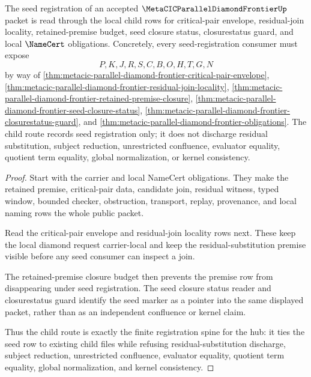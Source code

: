 \begin{theorem}
\label{thm:metacic-parallel-diamond-frontier-seed-registration-child-route}
The seed registration of an accepted $\MetaCICParallelDiamondFrontierUp$ packet is read through the local child rows for critical-pair envelope, residual-join locality, retained-premise budget, seed closure status, closurestatus guard, and local $\NameCert$ obligations. Concretely, every seed-registration consumer must expose
$$
P,K,J,R,S,C,B,O,H,T,G,N
$$
by way of \autoref{thm:metacic-parallel-diamond-frontier-critical-pair-envelope}, \autoref{thm:metacic-parallel-diamond-frontier-residual-join-locality}, \autoref{thm:metacic-parallel-diamond-frontier-retained-premise-closure}, \autoref{thm:metacic-parallel-diamond-frontier-seed-closure-status}, \autoref{thm:metacic-parallel-diamond-frontier-closurestatus-guard}, and \autoref{thm:metacic-parallel-diamond-frontier-obligations}. The child route records seed registration only; it does not discharge residual substitution, subject reduction, unrestricted confluence, evaluator equality, quotient term equality, global normalization, or kernel consistency.
\end{theorem}
\begin{proof}
Start with the carrier and local NameCert obligations. They make the retained premise, critical-pair data, candidate join, residual witness, typed window, bounded checker, obstruction, transport, replay, provenance, and local naming rows the whole public packet.

Read the critical-pair envelope and residual-join locality rows next. These keep the local diamond request carrier-local and keep the residual-substitution premise visible before any seed consumer can inspect a join.

The retained-premise closure budget then prevents the premise row from disappearing under seed registration. The seed closure status reader and closurestatus guard identify the seed marker as a pointer into the same displayed packet, rather than as an independent confluence or kernel claim.

Thus the child route is exactly the finite registration spine for the hub: it ties the seed row to existing child files while refusing residual-substitution discharge, subject reduction, unrestricted confluence, evaluator equality, quotient term equality, global normalization, and kernel consistency.
\end{proof}
